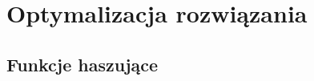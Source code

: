 ﻿\section{Optymalizacja rozwiązania}
\label{sec:optymalizacja}

\subsection{Funkcje haszujące}
\label{sec:hashfunction}